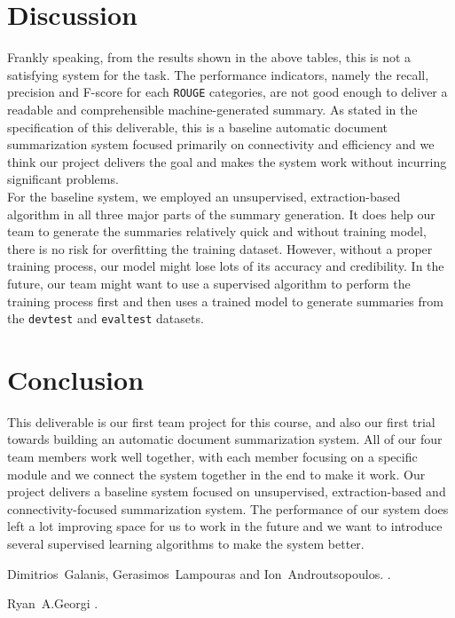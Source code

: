 \documentclass[11pt]{article}
\begin{document}
\section{Discussion}
Frankly speaking, from the results shown in the above tables, this is not a satisfying system for the task. The performance indicators, namely the recall, precision and F-score for each  \texttt{ROUGE} categories, are not good enough to deliver a readable and comprehensible machine-generated summary. As stated in the specification of this deliverable, this is a baseline automatic document summarization system focused primarily on connectivity and efficiency and we think our project delivers the goal and makes the system work without incurring significant problems.\\
\indent
For the baseline system, we employed an unsupervised, extraction-based algorithm in all three major parts of the summary generation. It does help our team to generate the summaries relatively quick and without training model, there is no risk for overfitting the training dataset. However, without a proper training process, our model might lose lots of its accuracy and credibility. In the future, our team might want to use a supervised algorithm to perform the training process first and then uses a trained model to generate summaries from the \texttt{devtest} and \texttt{evaltest} datasets. 

\section{Conclusion}

This deliverable is our first team project for this course, and also our first trial towards building an automatic document summarization system. All of our four team members work well together, with each member focusing on a specific module and we connect the system together in the end to make it work. Our project delivers a baseline system focused on unsupervised, extraction-based and connectivity-focused summarization system. The performance of our system does left a lot improving space for us to work in the future and we want to introduce several supervised learning algorithms to make the system better.

\begin{thebibliography}{}
Dimitrios~Galanis, Gerasimos~Lampouras and Ion~Androutsopoulos.
.

Ryan~A.Georgi
.

\end{thebibliography}
\end{document}
